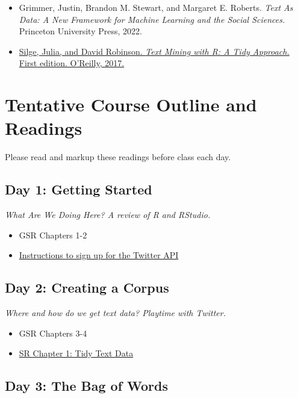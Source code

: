 \documentclass[11pt, letterpaper]{article}
\begin{document}
\begin{itemize}
\item Grimmer, Justin, Brandon M. Stewart, and Margaret E. Roberts. \textit{Text As Data: A New Framework for Machine Learning and the Social Sciences.} Princeton University Press, 2022.
\item \href{https://www.tidytextmining.com/index.html}{Silge, Julia, and David Robinson. \textit{Text Mining with R: A Tidy Approach.} First edition. O’Reilly, 2017.}
\end{itemize} 



\section*{Tentative Course Outline and Readings}

Please read and markup these readings before class each day.

\subsection*{Day 1: Getting Started}

\textit{What Are We Doing Here? A review of R and RStudio.}

\begin{itemize}
	\item GSR Chapters 1-2
	\item \href{https://joeornstein.github.io/pols-3230/week-11.html#getting-twitter-data}{Instructions to sign up for the Twitter API}
\end{itemize}

\subsection*{Day 2: Creating a Corpus}

\textit{Where and how do we get text data? Playtime with Twitter.}

\begin{itemize}
	\item GSR Chapters 3-4
	\item \href{https://www.tidytextmining.com/tidytext.html}{SR Chapter 1: Tidy Text Data}
\end{itemize}

\subsection*{Day 3: The Bag of Words}
\end{document}
